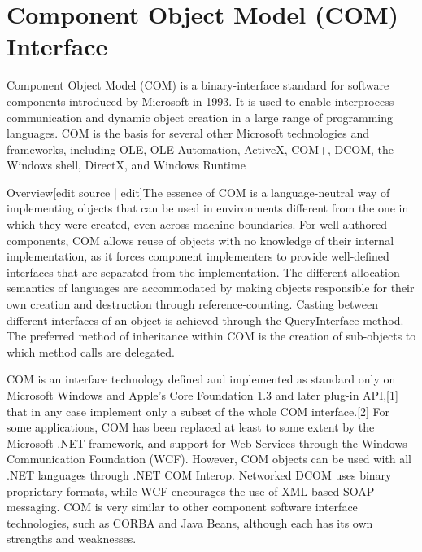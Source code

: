 
\section{Component Object Model (COM) Interface}
\label{COMInterface}

Component Object Model (COM) is a binary-interface standard for software components introduced by Microsoft in 1993. It is used to enable interprocess communication and dynamic object creation in a large range of programming languages. COM is the basis for several other Microsoft technologies and frameworks, including OLE, OLE Automation, ActiveX, COM+, DCOM, the Windows shell, DirectX, and Windows Runtime

\vpara
Overview[edit source | edit]The essence of COM is a language-neutral way of implementing objects that can be used in environments different from the one in which they were created, even across machine boundaries. For well-authored components, COM allows reuse of objects with no knowledge of their internal implementation, as it forces component implementers to provide well-defined interfaces that are separated from the implementation. The different allocation semantics of languages are accommodated by making objects responsible for their own creation and destruction through reference-counting. Casting between different interfaces of an object is achieved through the QueryInterface method. The preferred method of inheritance within COM is the creation of sub-objects to which method calls are delegated.

\vpara
COM is an interface technology defined and implemented as standard only on Microsoft Windows and Apple's Core Foundation 1.3 and later plug-in API,[1] that in any case implement only a subset of the whole COM interface.[2] For some applications, COM has been replaced at least to some extent by the Microsoft .NET framework, and support for Web Services through the Windows Communication Foundation (WCF). However, COM objects can be used with all .NET languages through .NET COM Interop. Networked DCOM uses binary proprietary formats, while WCF encourages the use of XML-based SOAP messaging. COM is very similar to other component software interface technologies, such as CORBA and Java Beans, although each has its own strengths and weaknesses.

